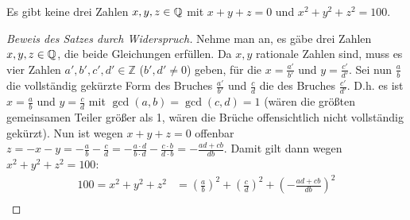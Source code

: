 \begin{thm}
    Es gibt keine drei Zahlen $x, y, z \in \mathbb{Q}$ mit $x + y + z = 0$ und $x^2 + y^2 + z^2 = 100$. \label{aufgabe_2}
\end{thm}
\begin{proof}[Beweis des Satzes durch Widerspruch]
    Nehme man an, es gäbe drei Zahlen $x, y, z \in \mathbb{Q}$, die beide Gleichungen erfüllen. 
    Da $x, y$ %
    rationale Zahlen sind, muss es vier Zahlen $a', b', c', d' \in \mathbb{Z}$ ($b', d' \neq 0$) geben, für die $x = 
    \frac{a'}{b'}$ und $y = \frac{c'}{d'}$. Sei nun $\frac{a}{b}$ die vollständig gekürzte Form des Bruches 
    $\frac{a'}{b'}$ und $\frac{c}{d}$ die des Bruches $\frac{c'}{d'}$. D.h. es ist $x = \frac{a}{b}$ und $y = 
    \frac{c}{d}$ mit $\gcd(a, b) = \gcd(c, d) = 1$ (wären die größten gemeinsamen Teiler größer als 1, wären die 
    Brüche offensichtlich nicht vollständig gekürzt). Nun ist wegen $x+y+z=0$ offenbar $z = -x-y = -\frac{a}{b} 
    - \frac{c}{d} = -\frac{a \cdot d}{b \cdot d} - \frac{c \cdot b}{d \cdot b} = - \frac{ad+cb}{db}$. Damit gilt 
    dann wegen $x^2+y^2+z^2 = 100$:
    \begin{align*}
        100 = x^2+y^2+z^2 &=\left(\frac{a}{b}\right)^2+\left(\frac{c}{d}\right)^2+\left(-\frac{ad+cb}{db}\right)^2\\

\end{align*}
\end{proof}
